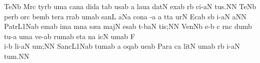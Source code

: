 \spatium
\divisiofinalis
\spatium
\sgn Te{}\pes Nb\egn
\spatium
\sgn M{\a}r\punctum c\egn
\sgn tyr\punctum b\egn
\sgn {}um\punctum a\egn
\spatium
\sgn can\punctum a\egn
\sgn did\punctum a\egn
\sgn {}{\a}t\pes ab\egn
\sgn {}us\punctum a\augmentum b\egn
\spatium
\divisiominor
\spatium
\custos a
\lineaproxima
\sgn lau\punctum a\egn
\sgn dat\punctum N\egn
\spatium
\sgn {}ex\pes ab\egn
\sgn {}{\e}r\punctum b\egn
\sgn ci-\clivis aN\egn
\sgn tu{s.}\punctum N\augmentum N\egn
\spatium
\divisiofinalis
\spatium
\sgn Te{}\pes Nb\egn
\spatium
\sgn per\punctum b\egn
\spatium
\sgn {}or\punctum c\egn
\sgn bem\punctum b\egn
\spatium
\sgn ter\punctum a\egn
\sgn r{\a}r\pes ab\egn
\sgn {}um\punctum a\augmentum b\egn
\spatium
\sgn san\punctum L\egn
{}a{}\pes Na\egn
\spatium
\sgn con\punctum a\egn
{}-\punctum a\egn
\custos a
\lineaproxima
\sgn t{\e}t\punctum a\egn
\sgn {}ur\punctum N\egn
\spatium
\sgn {}Ec\pes ab\egn
{}s\punctum b\egn
\sgn {}i-\clivis aN\egn
\sgn {}a{}\punctum N\augmentum N\egn
\spatium
\divisiofinalis
\spatium
\sgn Pa{tr}\episem L1\Salicus Nab\egn
\sgn {}em\punctum a\augmentum b\egn
\spatium
\divisiominima
\spatium
\sgn {}im\punctum a\egn
\sgn m{\e}n\punctum a\egn
\sgn s{\ae}{}\punctum a\egn
\spatium
\sgn maj\punctum N\egn
\sgn {}es\pes ab\egn
\sgn t{\a}-\climacus baN\egn
\sgn ti{s;}\punctum N\augmentum N\egn
\spatium
\divisiofinalis
\spatium
\sgn Ven\pes Nb\egn
\sgn {}e-\punctum b\egn
\custos c
\lineaproxima
\sgn r{\a}n\punctum c\egn
\sgn dum\punctum b\egn
\spatium
\sgn tu-\punctum a\egn
\sgn {}um\punctum a\egn
\spatium
\sgn ve-\pes ab\egn
\sgn rum\punctum a\augmentum b\egn
\spatium
\divisiominor
\spatium
\sgn {}et\punctum a\egn
\spatium
\sgn {}{\u}n\punctum a\egn
\sgn {}ic\punctum N\egn
\sgn {}um\pes ab\egn
\spatium
\sgn F{\\i}-\punctum b\egn
\sgn li-\clivis aN\egn
\sgn {}u{m;}\punctum N\augmentum N\egn
\spatium
\divisiofinalis
\spatium
\sgn Sa{nc}\episem L1\Salicus Nab\egn
\sgn tu{m}\punctum a\augmentum b\egn
\spatium
\custos a
\lineaproxima
{}oq\pes ab\egn
\sgn ue{}\punctum a\augmentum b\egn
\spatium
\divisiominima
\spatium
\sgn Par\punctum a\egn
\sgn {}{\a}c\punctum a\egn
\sgn lit\punctum N\egn
\sgn {}um\pes ab\egn
\spatium
{}r\punctum b\egn
\sgn {}i-\clivis aN\egn
\sgn tu{m.}\punctum N\augmentum N\egn
